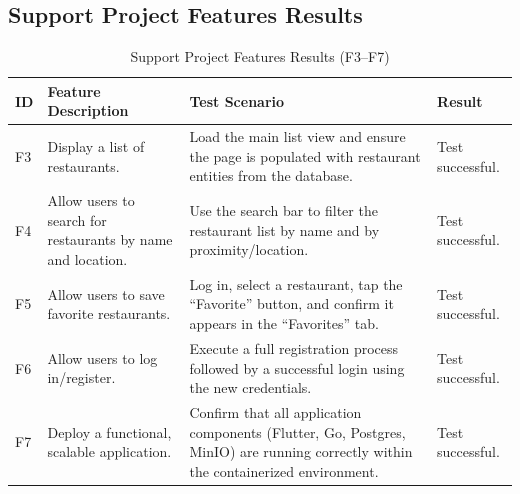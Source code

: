 \subsection{Support Project Features Results}
\begin{table}[H]
	\centering
	\caption{Support Project Features Results (F3--F7)}
	\label{tab:support-features-results}
	{\small\setlength{\tabcolsep}{4pt}
	\begin{tabularx}{\textwidth}{@{}l p{} >{\raggedright\arraybackslash}X l@{}}
		\toprule
		\textbf{ID} & \textbf{Feature Description} & \textbf{Test Scenario} & \textbf{Result} \\
		\midrule
		F3 & Display a list of restaurants. & Load the main list view and ensure the page is populated with restaurant entities from the database. & Test successful. \\
		F4 & Allow users to search for restaurants by name and location. & Use the search bar to filter the restaurant list by name and by proximity/location. & Test successful. \\
		F5 & Allow users to save favorite restaurants. & Log in, select a restaurant, tap the ``Favorite'' button, and confirm it appears in the ``Favorites'' tab. & Test successful. \\
		F6 & Allow users to log in/register. & Execute a full registration process followed by a successful login using the new credentials. & Test successful. \\
		F7 & Deploy a functional, scalable application. & Confirm that all application components (Flutter, Go, Postgres, MinIO) are running correctly within the containerized environment. & Test successful. \\
		\bottomrule
	\end{tabularx}}
\end{table}

